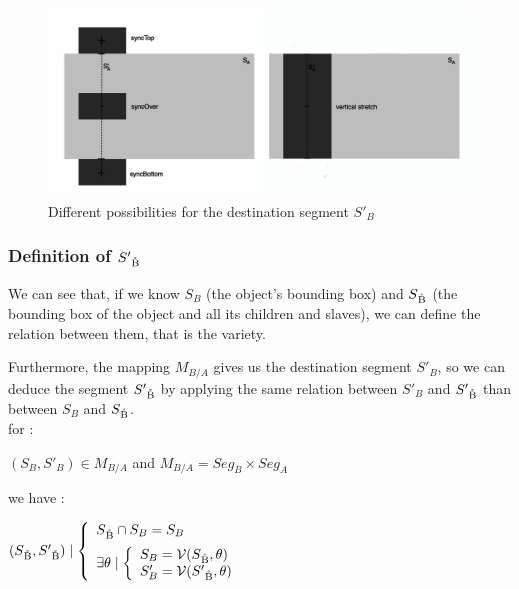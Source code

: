 \documentclass[a4paper]{article}
\newcommand{\variete}			{\ensuremath{\mathcal{V}}}
\begin{document}
\begin{figure}[h]
\begin{center}
\includegraphics[width=16cm]{img/top_over_bottomF.png}
\caption{Different possibilities for the destination segment $S'_B$}
\label{fig:possibleDestRect}
\end{center}
\end{figure}


\subsubsection{Definition of $S'\textsubscript{\r{B}}$}\label{subsubsec:defDestChildRect}

We can see that, if we know $S_B$ (the object's bounding box) and $S\textsubscript{\r{B}}$ (the bounding box of the object and all its children and slaves), we can define the relation between them, that is the variety. 

Furthermore, the mapping $M_{B/A}$ gives us the destination segment $S'_B$, so we can deduce the segment $S'\textsubscript{\r{B}}$ by applying the same relation between $S'_B$ and $S'\textsubscript{\r{B}}$ than between $S_B$ and $S\textsubscript{\r{B}}$.
\\

for : \begin{center} $(S_B, S'_B) \in M_{B/A}$ and $M_{B/A} = Seg_B \times Seg_A$ \end{center}

we have :

\begin{center}
$(S\textsubscript{\r{B}}, S'\textsubscript{\r{B}}) \mid \left\lbrace 
\begin{array}{lcl} 
  S\textsubscript{\r{B}} \cap S_B = S_B\\ [0.2cm]
  \exists \theta \mid \left\lbrace
  \begin{array}{lcl}
    S_B = \variete(S\textsubscript{\r{B}}, \theta)\\%
    S'_B = \variete(S'\textsubscript{\r{B}}, \theta)
  \end{array}\right.
\end{array}\right.$
\end{center}
\end{document}
